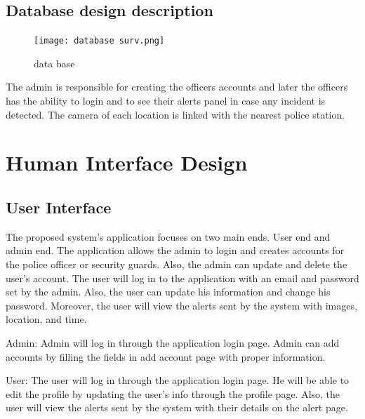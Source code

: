 \documentclass[12pt]{article}
\begin{document}
\subsection{Database design description}

\begin{figure}[h]
  \centering
  \texttt{[image: database surv.png]}
  \label{fig:2}
   \caption{data base}
\end{figure}
The admin is responsible for creating the officers accounts and later the officers has the ability to login and to see their alerts panel in case any incident is detected.
The camera of each location is linked with the nearest police station.
\FloatBarrier
\FloatBarrier

\section{Human Interface Design}
\label{hid}
\subsection {User Interface}
The proposed system's application focuses on two main ends. User end and admin end. The application allows the admin to login and creates accounts for the police officer or security guards. Also, the admin can update and delete the user's account. The user will log in to the application with an email and password set by the admin. Also, the user can update his information and change his password. Moreover, the user will view the alerts sent by the system with images, location, and time.

Admin: Admin will log in through the application login page. Admin can add accounts by filling the fields in add account page with proper information.

User: The user will log in through the application login page. He will be able to edit the profile by updating the user's info through the profile page. Also, the user will view the alerts sent by the system with their details on the alert page.

\newpage
\end{document}
